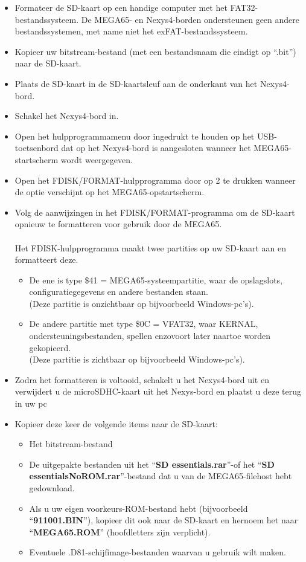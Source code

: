 \begin{itemize}
  \item{Formateer de SD-kaart} op een handige computer met het FAT32-bestandssysteem. De MEGA65- en Nexys4-borden ondersteunen geen andere bestandssystemen, met name niet het exFAT-bestandssysteem.\item{Kopieer} uw bitstream-bestand (met een bestandsnaam die eindigt op ``.bit'') naar de SD-kaart.\item{Plaats} de SD-kaart in de SD-kaartsleuf aan de onderkant van het Nexys4-bord.\item{Schakel} het Nexys4-bord in.\item{Open het hulpprogrammamenu} door  ingedrukt te houden op het USB-toetsenbord dat op het Nexys4-bord is aangesloten wanneer het MEGA65-startscherm wordt weergegeven.\item{Open het FDISK/FORMAT-hulpprogramma} door op 2 te drukken wanneer de optie verschijnt op het MEGA65-opstartscherm.\item{Volg de aanwijzingen} in het FDISK/FORMAT-programma om de SD-kaart opnieuw te formatteren voor gebruik door de MEGA65. \\
  \\
  Het FDISK-hulpprogramma maakt twee partities op uw SD-kaart aan en formatteert deze.
  \begin{itemize}
    \item De ene is type \$41 = MEGA65-systeempartitie, waar de opslagslots, configuratiegegevens en andere bestanden staan. \\  (Deze partitie is onzichtbaar op bijvoorbeeld Windows-pc's).    \item De andere partitie met type \$0C = VFAT32, waar KERNAL, ondersteuningsbestanden, spellen enzovoort later naartoe worden gekopieerd. \\  (Deze partitie is zichtbaar op bijvoorbeeld Windows-pc's).
  \end{itemize}
\item{Zodra het formatteren is voltooid}, schakelt u het Nexys4-bord uit en verwijdert u de microSDHC-kaart uit het Nexys-bord en plaatst u deze terug in uw pc\item{Kopieer} deze keer de volgende items naar de SD-kaart:
  \begin{itemize}
    \item Het bitstream-bestand    \item De uitgepakte bestanden uit het ``\textbf{SD essentials.rar}''-of het ``\textbf{SD essentialsNoROM.rar}''-bestand dat u van de MEGA65-filehost hebt gedownload.    \item{Als u uw eigen voorkeurs-ROM-bestand hebt} (bijvoorbeeld ``\textbf{911001.BIN}''), kopieer dit ook naar de SD-kaart en hernoem het naar ``\textbf{MEGA65.ROM}'' (hoofdletters zijn verplicht).    \item{Eventuele .D81-schijfimage-bestanden} waarvan u gebruik wilt maken.

\end{itemize}
\end{itemize}
